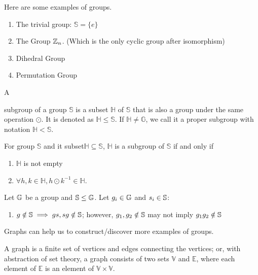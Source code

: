 \documentclass[../note.tex]{subfiles}
\begin{document}
Here are some examples of groups. 
\begin{enumerate}
	\item The trivial group: $\mathbb{S}=\{e\}$
	\item The Group $\mathbb{Z}_n$. (Which is the only cyclic group after isomorphism)
	\item Dihedral Group 
	\item Permutation Group
\end{enumerate}

\begin{definition}[Subgroup]
	\hypertarget{def:subgroup}{A} subgroup of a group $\mathbb{S}$ is a subset $\mathbb{H}$ of $\mathbb{S}$ that is also a group under the same operation $\odot$. It is denoted as $ \mathbb{H}\leq \mathbb{S}$. If $\mathbb{H} \neq \mathbb{G}$, we call it a proper subgroup with notation $\mathbb{H}< \mathbb{S}$.
\end{definition}

\begin{theorem} 
	For group $\mathbb{S}$ and it subset$\mathbb{H} \subseteq \mathbb{S}$, $\mathbb{H}$ is a subgroup of $\mathbb{S}$ if and only if 
	\begin{enumerate}
		\item $\mathbb{H}$ is not empty 
		\item $\forall h,k \in \mathbb{H}, h\odot k^{-1} \in \mathbb{H}$.
	\end{enumerate}
\end{theorem}

\begin{theorem} 
	Let $\mathbb{G}$ be a group and $\mathbb{S}\leq \mathbb{G}$. Let $g_i\in \mathbb{G}$ and $s_i \in \mathbb{S}$:
	\begin{enumerate}
		\item $g\notin \mathbb{S} \implies gs, sg \notin \mathbb{S}$; however, $g_1, g_2 \notin \mathbb{S}$ may not imply $g_1g_2 \notin \mathbb{S}$
	\end{enumerate}
\end{theorem}

Graphs can help us to construct/discover more examples of groups.

\begin{definition}[Graph]
	A graph is a finite set of vertices and edges connecting the vertices;
	or, with abstraction of set theory, a graph consists of two sets $\mathbb{V}$ and $\mathbb{E}$, where each element of $\mathbb{E}$ is an element of $\mathbb{V}\times \mathbb{V}.$
\end{definition}
\end{document}
